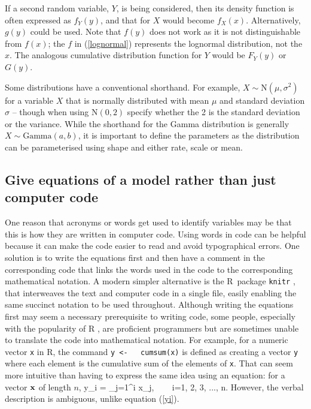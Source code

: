 If a second random
variable, $Y$, is being considered, then its density function
is often expressed as $f_Y(y)$, and that for $X$ would become $f_X(x)$.
Alternatively, $g(y)$ could be used. Note that $f(y)$ does not work as it
is not distinguishable from $f(x)$; the $f$ in (\ref{lognormal})
represents the lognormal distribution, not the $x$.
The analogous cumulative distribution function for $Y$ would
be $F_Y(y)$ or $G(y)$.

Some distributions have a conventional shorthand. For example, $X \sim
\mbox{N}(\mu, \sigma^2)$ for a variable $X$ that is normally distributed with
mean $\mu$ and standard deviation $\sigma$ -- though when using N$(0,2)$
specify whether the 2 is the standard deviation or the variance.
While the shorthand for the Gamma
distribution is generally $X \sim \mbox{Gamma}(a, b)$, it is important to define
the parameters as the distribution can be parameterised using shape and either
rate, scale or mean.

\subsection*{Give equations of a model rather than just computer code}

One reason that acronyms or words get used to identify variables may be
that this is how they are written in computer code. Using words in code
can be helpful because it can make the code easier to read and avoid typographical
errors. One solution is to write the equations first and then have a
comment in the corresponding code that links the words used in the code to the
corresponding mathematical
notation. A modern simpler alternative is the R~package {\tt knitr} \citep{xie18},
that interweaves the text and computer code in a
single file, easily enabling the same succinct notation to be used throughout.
Although writing the equations first may seem a necessary
prerequisite to writing code, some people, especially with the popularity of R
\citep{R18}, are proficient programmers but are sometimes unable to translate the
code into mathematical notation. For example,
for a numeric vector {\tt x} in R, the command
\eb
\nonumber
{\tt y <\!\!\!- ~ cumsum(x)}
\label{cumsum}
\ee
is defined as creating a vector {\tt y} where each element is the cumulative sum
of the elements of {\tt x}. That can seem more intuitive than having to
express the same
idea using an equation: for a vector ${\bf x}$ of length $n$,
\eb
y_i = \sum_{j=1}^i x_j, ~~~ i=1, 2, 3, ..., n.
\label{yi}
\ee
However, the verbal description is ambiguous, unlike equation (\ref{yi}).

